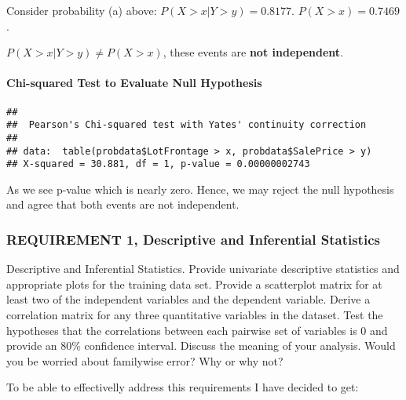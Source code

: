 \documentclass[]{article}
\newenvironment{Shaded}{\begin{snugshade}}{\end{snugshade}}
\newcommand{\KeywordTok}[1]{\textcolor[rgb]{0.13,0.29,0.53}{\textbf{#1}}}
\newcommand{\NormalTok}[1]{#1}
\newcommand{\OperatorTok}[1]{\textcolor[rgb]{0.81,0.36,0.00}{\textbf{#1}}}
\let\oldparagraph\paragraph
\renewcommand{\paragraph}[1]{\oldparagraph{#1}\mbox{}}
\begin{document}
Consider probability (a) above: \(P(X>x | Y>y)=0.8177\).
\(P(X>x)=0.7469\).

\(P(X>x | Y>y) \ne P(X>x)\), these events are \textbf{not independent}.

\hypertarget{chi-squared-test-to-evaluate-null-hypothesis}{%
\paragraph{Chi-squared Test to Evaluate Null
Hypothesis}\label{chi-squared-test-to-evaluate-null-hypothesis}}

\begin{Shaded}
\end{Shaded}

\begin{verbatim}
## 
##  Pearson's Chi-squared test with Yates' continuity correction
## 
## data:  table(probdata$LotFrontage > x, probdata$SalePrice > y)
## X-squared = 30.881, df = 1, p-value = 0.00000002743
\end{verbatim}

As we see p-value which is nearly zero. Hence, we may reject the null
hypothesis and agree that both events are not independent.

\hypertarget{requirement-1-descriptive-and-inferential-statistics}{%
\subsubsection{REQUIREMENT 1, Descriptive and Inferential
Statistics}\label{requirement-1-descriptive-and-inferential-statistics}}

Descriptive and Inferential Statistics. Provide univariate descriptive
statistics and appropriate plots for the training data set. Provide a
scatterplot matrix for at least two of the independent variables and the
dependent variable. Derive a correlation matrix for any three
quantitative variables in the dataset. Test the hypotheses that the
correlations between each pairwise set of variables is 0 and provide an
80\% confidence interval. Discuss the meaning of your analysis. Would
you be worried about familywise error? Why or why not?

To be able to effectivelly address this requirements I have decided to
get:
\end{document}
